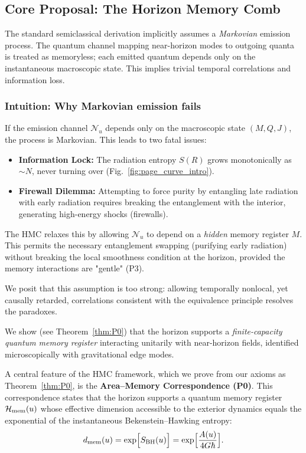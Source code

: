 \documentclass[11pt,a4paper]{article}
\newcommand{\HMC}{\textsc{HMC}\xspace}
\theoremstyle{plain}
\theoremstyle{definition}
\theoremstyle{remark}
\begin{document}
\subsection{Core Proposal: The Horizon Memory Comb}

The standard semiclassical derivation implicitly assumes a \emph{Markovian} emission process. The quantum channel mapping near-horizon modes to outgoing quanta is treated as memoryless; each emitted quantum depends only on the instantaneous macroscopic state. This implies trivial temporal correlations and information loss.

\subsubsection{Intuition: Why Markovian emission fails}
If the emission channel $\mathcal{N}_u$ depends only on the macroscopic state $(M,Q,J)$, the process is Markovian.
This leads to two fatal issues:
\begin{itemize}
    \item \textbf{Information Lock:} The radiation entropy $S(R)$ grows monotonically as $\sim N$, never turning over (Fig.~\ref{fig:page_curve_intro}).
    \item \textbf{Firewall Dilemma:} Attempting to force purity by entangling late radiation with early radiation requires breaking the entanglement with the interior, generating high-energy shocks (firewalls).
\end{itemize}
The HMC relaxes this by allowing $\mathcal{N}_u$ to depend on a \emph{hidden} memory register $M$. This permits the necessary entanglement swapping (purifying early radiation) without breaking the local smoothness condition at the horizon, provided the memory interactions are "gentle" (P3).

We posit that this assumption is too strong: allowing temporally nonlocal, yet causally retarded, correlations consistent with the equivalence principle resolves the paradoxes.

We show (see Theorem~\ref{thm:P0}) that the horizon supports a \emph{finite-capacity quantum memory register} interacting unitarily with near-horizon fields, identified microscopically with gravitational edge modes.

A central feature of the \HMC{} framework, which we prove from our axioms as Theorem~\ref{thm:P0}, is the \textbf{Area--Memory Correspondence (P0)}. This correspondence states that the horizon supports a quantum memory register $\mathcal{H}_{\rm mem}(u)$ whose effective dimension accessible to the exterior dynamics equals the exponential of the instantaneous Bekenstein--Hawking entropy:
\begin{equation}
    d_{\rm mem}(u)=\exp\!\Big[S_{\rm BH}(u)\Big] = \exp\!\Big[\frac{A(u)}{4G\hbar}\Big].
    \label{eq:mem-dim}
\end{equation}
\end{document}
